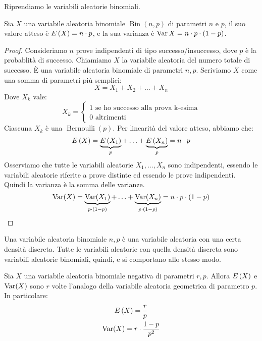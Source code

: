 Riprendiamo le variabili aleatorie binomiali.
\begin{fact}
Sia $X$ una variabile aleatoria binomiale $\operatorname{Bin}(n,p)$ di parametri $n$ e $p$, il suo valore atteso \`e $E \left( X \right) = n \cdot p$, e la sua varianza \`e $\operatorname{Var} X = n \cdot p \cdot (1 - p)$.
\end{fact}
\begin{proof}
Consideriamo $n$ prove indipendenti di tipo successo/insuccesso, dove $p$ \`e la probablit\`a di successo. Chiamiamo $X$ la variabile aleatoria del numero totale di successo. \`E una variabile aleatoria binomiale di parametri $n, p$. Scriviamo $X$ come una somma di parametri pi\`u semplici:
\[
X = X_1 + X_2 + \ldots + X_n
\]
Dove $X_k$ vale:
\[
X_k =
\begin{cases}
1 \text{ se ho successo alla prova k-esima} \\
0 \text{ altrimenti}
\end{cases}
\]
Ciascuna $X_k$ \`e una $\operatorname{Bernoulli}(p)$. Per linearit\`a del valore atteso, abbiamo che:
\[
E \left( X \right) = \underbrace{E \left( X_1 \right)}_{p} + \ldots + \underbrace{E \left( X_n \right)}_{p} = n \cdot p
\]
Osserviamo che tutte le variabili aleatorie $X_1, \ldots, X_n$ sono indipendenti, essendo le variabili aleatorie riferite a prove distinte ed essendo le prove indipendenti. Quindi la varianza \`e la somma delle varianze.
\[
\operatorname{Var} (X) = \underbrace{\operatorname{Var}(X_1)}_{p \cdot (1-p)} + \ldots + \underbrace{\operatorname{Var}(X_n)}_{p \cdot (1-p)} = n \cdot p \cdot (1 - p)
\]
\end{proof}
Una variabile aleatoria binomiale $n, p$ \`e una variabile aleatoria con una certa densit\`a discreta. Tutte le variabili aleatorie con quella densit\`a discreta sono variabili aleatorie binomiali, quindi, e si comportano allo stesso modo.

\begin{fact}
Sia $X$ una variabile aleatoria binomiale negativa di parametri $r, p$. Allora $E \left( X \right)$ e $\operatorname{Var} (X)$ sono $r$ volte l'analogo della variabile aleatoria geometrica di parametro $p$. In particolare: 
\begin{gather*}
E \left( X \right) = \frac{r}{p} \\
\operatorname{Var} (X) = r \cdot \frac{1 - p}{p^2}
\end{gather*}
\end{fact}

